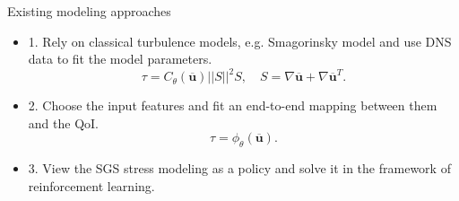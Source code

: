 \documentclass[aspectratio=169]{beamer}
\begin{document}
\begin{frame}{Existing modeling approaches}
	\begin{itemize}
		\item 1. Rely on classical turbulence models, e.g. Smagorinsky model and
		use DNS data to fit the model parameters.
		\begin{equation*}
			\tau = C_{\theta}(\overline{\mathbf{u}})||S||^2 S, \quad S = \nabla \overline{\mathbf{u}} + \nabla \overline{\mathbf{u}}^T.
		\end{equation*}
		\item 2. Choose the input features and fit an end-to-end mapping between
		them and the QoI.
		\begin{equation*}
			\tau = \phi_{\theta}(\overline{\mathbf{u}}).
		\end{equation*}
		\item 3. View the SGS stress modeling as a policy and solve it in the
		framework of reinforcement learning.
	\end{itemize}
\end{frame}


\end{document}
